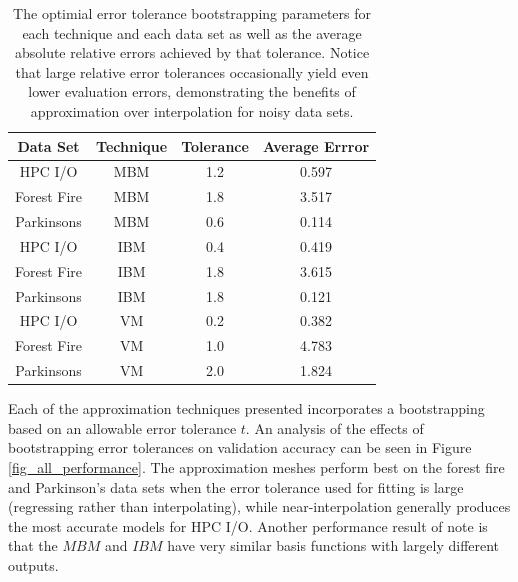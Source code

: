 \begin{table}
  \centering
  \begin{tabular}{c|c|c|c}
    \hline
    \textbf{Data Set} & \textbf{Technique} & \textbf{Tolerance} & \textbf{Average Errror}\\
    \hline
    HPC I/O & MBM & 1.2 & 0.597\\
    Forest Fire & MBM & 1.8 & 3.517\\
    Parkinsons & MBM & 0.6 & 0.114\\
    \hline
    HPC I/O & IBM & 0.4 & 0.419\\
    Forest Fire & IBM & 1.8 & 3.615\\
    Parkinsons & IBM & 1.8 & 0.121\\
    \hline
    HPC I/O & VM & 0.2 & 0.382\\
    Forest Fire & VM & 1.0 & 4.783\\
    Parkinsons & VM & 2.0 & 1.824\\
    \hline
  \end{tabular}
  \caption{The optimial error tolerance bootstrapping parameters for each technique and each data set as well as the average absolute relative errors achieved by that tolerance. Notice that large relative error tolerances occasionally yield even lower evaluation errors, demonstrating the benefits of approximation over interpolation for noisy data sets.
  \vspace{-1cm}}
  \label{tab_optimal_tolerance}
\end{table}

Each of the approximation techniques presented incorporates a bootstrapping based on an allowable error tolerance $t$. An analysis of the effects of bootstrapping error tolerances on validation accuracy can be seen in Figure \ref{fig_all_performance}. The approximation meshes perform best on the forest fire and Parkinson's data sets when the error tolerance used for fitting is large (regressing rather than interpolating), while near-interpolation generally produces the most accurate models for HPC I/O. Another performance result of note is that the $MBM$ and $IBM$ have very similar basis functions with largely different outputs.

